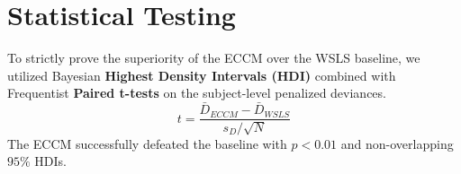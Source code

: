 \documentclass[11pt,a4paper]{article}
\begin{document}
\section{Statistical Testing}
To strictly prove the superiority of the ECCM over the WSLS baseline, we utilized Bayesian \textbf{Highest Density Intervals (HDI)} combined with Frequentist \textbf{Paired t-tests} on the subject-level penalized deviances.
\begin{equation}
    t = \frac{\bar{D}_{ECCM} - \bar{D}_{WSLS}}{s_D / \sqrt{N}}
\end{equation}
The ECCM successfully defeated the baseline with $p < 0.01$ and non-overlapping $95\%$ HDIs.
\end{document}
